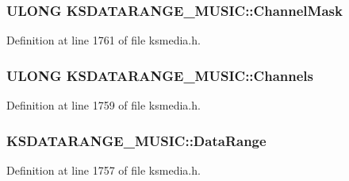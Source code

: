 \subsubsection[{\texorpdfstring{Channel\+Mask}{ChannelMask}}]{\setlength{\rightskip}{0pt plus 5cm}U\+L\+O\+NG K\+S\+D\+A\+T\+A\+R\+A\+N\+G\+E\+\_\+\+M\+U\+S\+I\+C\+::\+Channel\+Mask}\hypertarget{struct_k_s_d_a_t_a_r_a_n_g_e___m_u_s_i_c_a9a2001bfe540df78d935bd559221eecb}{}\label{struct_k_s_d_a_t_a_r_a_n_g_e___m_u_s_i_c_a9a2001bfe540df78d935bd559221eecb}


Definition at line 1761 of file ksmedia.\+h.

\subsubsection[{\texorpdfstring{Channels}{Channels}}]{\setlength{\rightskip}{0pt plus 5cm}U\+L\+O\+NG K\+S\+D\+A\+T\+A\+R\+A\+N\+G\+E\+\_\+\+M\+U\+S\+I\+C\+::\+Channels}\hypertarget{struct_k_s_d_a_t_a_r_a_n_g_e___m_u_s_i_c_a007463c8c89599bdfd52e7dde7980ea9}{}\label{struct_k_s_d_a_t_a_r_a_n_g_e___m_u_s_i_c_a007463c8c89599bdfd52e7dde7980ea9}


Definition at line 1759 of file ksmedia.\+h.

\subsubsection[{\texorpdfstring{Data\+Range}{DataRange}}]{ K\+S\+D\+A\+T\+A\+R\+A\+N\+G\+E\+\_\+\+M\+U\+S\+I\+C\+::\+Data\+Range}\hypertarget{struct_k_s_d_a_t_a_r_a_n_g_e___m_u_s_i_c_a44b2581ae1b92e20d41af392cfc87722}{}\label{struct_k_s_d_a_t_a_r_a_n_g_e___m_u_s_i_c_a44b2581ae1b92e20d41af392cfc87722}


Definition at line 1757 of file ksmedia.\+h.


